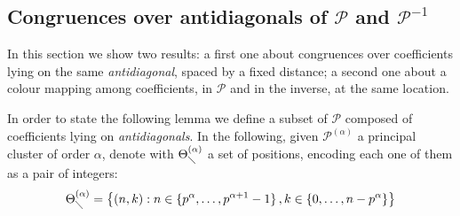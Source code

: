 \subsection{Congruences over antidiagonals of $\mathcal{P}$ and $\mathcal{P}^{-1}$}

In this section we show two results: a first one about congruences over coefficients
lying on the same \emph{antidiagonal}, spaced by a fixed distance; a second one
about a colour mapping among coefficients, in $\mathcal{P}$ and in the inverse,
at the same location.


\iffalse
\begin{corollary}
Let $\mathcal{P}$ be the Pascal array and let $p$ be a prime. Choose $k\in\mathbb{N}$, 
than $k$-th column is congruent to $k$-antidiagonal, modulo $p$.
\end{corollary}
\begin{proof}
    \begin{displaymath}
        \begin{split}
            { {n} \choose {k} } &\equiv_{p} { {n} \choose {n-k} } \\
            d_{nk} &\equiv_{p} d_{n,n-k}\\
            \sum_{n\geq 0}{d_{nk} t^n} &\equiv_{p}\sum_{n\geq 0}{d_{n,n-k} t^n} \\
            d(t)h(t)^k &\equiv_{p}\sum_{n\geq 0}{d_{n,n-k} t^n} \\
        \end{split}
    \end{displaymath}
no a standard form for antidiagonal exists, so on the right we leave the explicit
expression for the $k$-th antidiagonal.
\end{proof}
\fi

In order to state the following lemma we define a subset of $\mathcal{P}$
composed of coefficients lying on \emph{antidiagonals}. In the following, 
given $\mathcal{P}^{(\alpha)}$ a principal cluster of order $\alpha$, 
denote with $\Theta_{\diagdown}^{(\alpha)}$ a set of positions, encoding
each one of them as a pair of integers:
\begin{displaymath}
    \Theta_{\diagdown}^{(\alpha)}=\left\lbrace(n,k) : n\in\lbrace p^{\alpha},\ldots,p^{\alpha+1}-1\rbrace
        \,,k\in\lbrace0,\ldots,n-p^{\alpha}\rbrace    \right\rbrace
\end{displaymath}

